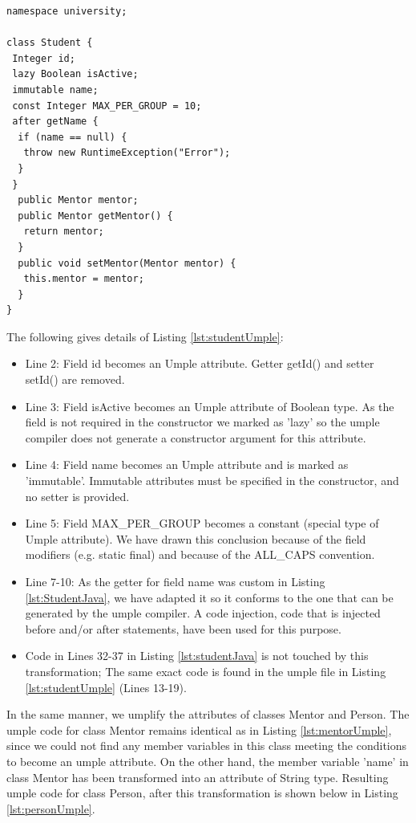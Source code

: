 \begin{lstlisting}[style=umpleOut,caption=Student.ump,label=lst:studentUmple]
namespace university;

class Student { 
 Integer id; 
 lazy Boolean isActive; 
 immutable name; 
 const Integer MAX_PER_GROUP = 10; 
 after getName {
  if (name == null) { 
   throw new RuntimeException("Error");
  }
 }
  public Mentor mentor; 
  public Mentor getMentor() { 
   return mentor; 
  }
  public void setMentor(Mentor mentor) { 
   this.mentor = mentor; 
  } 
}
\end{lstlisting}

The following gives details of Listing \ref{lst:studentUmple}:
\begin{itemize}
\item Line 2: Field id becomes an Umple attribute. Getter getId() and setter setId() are removed.

\item Line 3: Field isActive becomes an Umple attribute of Boolean type.  As the field is not required in the constructor we marked as 'lazy' so the umple compiler does not generate a constructor argument for this attribute. 

\item Line 4: Field name becomes an Umple attribute and is marked as 'immutable'. Immutable attributes must be specified in the constructor, and no setter is provided.

\item Line 5: Field MAX\_PER\_GROUP becomes a constant (special type of Umple attribute). We have drawn this conclusion because of the field modifiers (e.g. static final) and because of the ALL\_CAPS convention. 

\item Line 7-10: As the getter for field name was custom in Listing \ref{lst:StudentJava}, we have adapted it so it conforms to the one that can be generated by the umple compiler. A code injection, code that is injected before and/or after statements, have been used for this purpose.

\item Code in Lines 32-37 in Listing \ref{lst:studentJava} is not touched by this transformation; The same exact code is found in the umple file in Listing \ref{lst:studentUmple} (Lines 13-19).
\end{itemize}

In the same manner, we umplify the attributes of classes Mentor and Person.
The umple code for class Mentor remains identical as in Listing \ref{lst:mentorUmple}, since we could not find any member variables in this class meeting the conditions to become an umple attribute. On the other hand, the member variable 'name' in class Mentor has been transformed into an attribute of String type. Resulting umple code for class Person, after this transformation is shown below in Listing \ref{lst:personUmple}.

